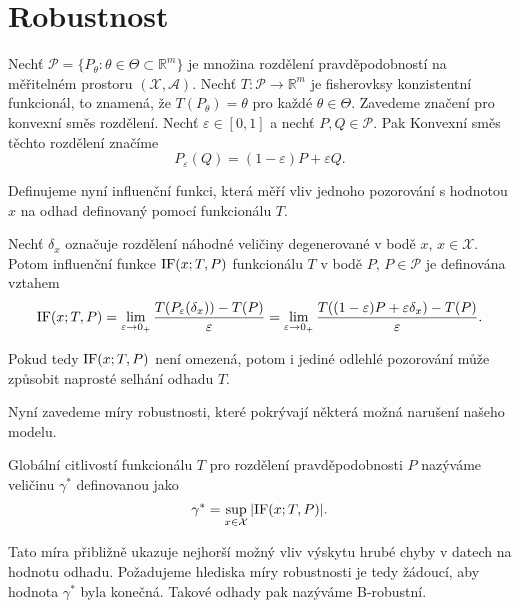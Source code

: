 \chapter{Robustnost}

Nech\v{t} $\mathcal{P} = \lbrace P_\theta : \theta \in \Theta \subset \mathbb{R}^m \rbrace$ je množina rozdělení pravděpodobností na měřitelném prostoru $\left(\mathcal{X},\mathcal{A}\right)$. Nech\v{t} $T: \mathcal{P} \rightarrow \mathbb{R}^m$ je fisherovksy konzistentní funkcionál, to znamená, že $T(P_\theta) = \theta$ pro každé $\theta \in \Theta$. Zavedeme značení pro konvexní směs rozdělení. Nech\v{t} $\varepsilon \in [0,1]$ a nech\v{t} $P, Q \in \mathcal{P}$. Pak Konvexní směs těchto rozdělení značíme 
\begin{equation}
	P_\varepsilon(Q) = (1-\varepsilon)P + \varepsilon Q.
\end{equation}

\noindent
Definujeme nyní influenční funkci, která měří vliv jednoho pozorování s hodnotou $x$ na odhad definovaný pomocí funkcionálu $T$. 

\begin{definition}
	Nech\v{t} $\delta_x$ označuje rozdělení náhodné veličiny degenerované v bodě $x,\, x \in \mathcal{X}$. Potom influenční funkce $\mathrm{IF}({x};T,P)$ funkcionálu $T$ v bodě $P,\, P \in \mathcal{P}$ je definována vztahem
	\begin{equation}
		\mathrm{IF}({x};T,P) = \lim_{\varepsilon \rightarrow 0_+} \frac{T(P_\varepsilon(\delta_x)) - T(P)}{\varepsilon} = \lim_{\varepsilon \rightarrow 0_+} \frac{T((1-\varepsilon)P + \varepsilon\delta_x) - T(P)}{\varepsilon}.
	\end{equation} 
\end{definition}

\noindent
Pokud tedy $\mathrm{IF}({x};T,P)$ není omezená, potom i jediné odlehlé pozorování může způsobit naprosté selhání odhadu $T$. 

Nyní zavedeme míry robustnosti, které pokrývají některá možná narušení našeho modelu. 

\begin{definition}
	Globální citlivostí funkcionálu $T$ pro rozdělení pravděpodobnosti $P$ nazýváme veličinu $\gamma^*$ definovanou jako
	\begin{equation}
		\gamma^* = \sup_{x \in \mathcal{X}} |\mathrm{IF}({x};T,P)|.
	\end{equation}
\end{definition}
Tato míra přibližně ukazuje nejhorší možný vliv výskytu hrubé chyby v datech na hodnotu odhadu. Požadujeme hlediska míry robustnosti je tedy žádoucí, aby hodnota $\gamma^*$ byla konečná. Takové odhady pak nazýváme B-robustní.


